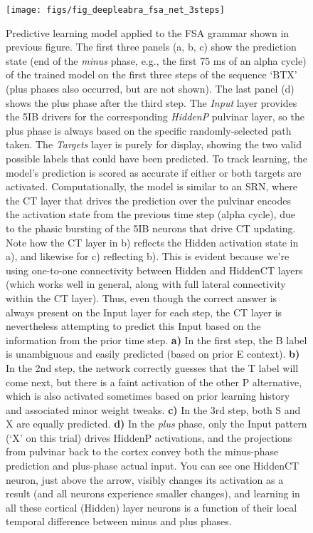 \documentclass[11pt,twoside]{article}
\newif\myifpdf
\begin{document}
\begin{figure}
  \centering\texttt{[image: figs/fig\_deepleabra\_fsa\_net\_3steps]}
  \caption{\footnotesize Predictive learning model applied to the FSA grammar shown in previous figure. The first three panels (a, b, c) show the prediction state (end of the \emph{minus} phase, e.g., the first 75 ms of an alpha cycle) of the trained model on the first three steps of the sequence `BTX' (plus phases also occurred, but are not shown).  The last panel (d) shows the plus phase after the third step.  The \emph{Input} layer provides the 5IB drivers for the corresponding \emph{HiddenP} pulvinar layer, so the plus phase is always based on the specific randomly-selected path taken.  The \emph{Targets} layer is purely for display, showing the two valid possible labels that could have been predicted.  To track learning, the model's prediction is scored as accurate if either or both targets are activated.  Computationally, the model is similar to an SRN, where the CT layer that drives the prediction over the pulvinar encodes the activation state from the previous time step (alpha cycle), due to the phasic bursting of the 5IB neurons that drive CT updating.  Note how the CT layer in b) reflects the Hidden activation state in a), and likewise for c) reflecting b).  This is evident because we're using one-to-one connectivity between Hidden and HiddenCT layers (which works well in general, along with full lateral connectivity within the CT layer).  Thus, even though the correct answer is always present on the Input layer for each step, the CT layer is nevertheless attempting to predict this Input based on the information from the prior time step.  {\bf a)} In the first step, the B label is unambiguous and easily predicted (based on prior E context). {\bf b)} In the 2nd step, the network correctly guesses that the T label will come next, but there is a faint activation of the other P alternative, which is also activated sometimes based on prior learning history and associated minor weight tweaks.  {\bf c)} In the 3rd step, both S and X are equally predicted.  {\bf d)} In the \emph{plus} phase, only the Input pattern (`X' on this trial) drives HiddenP activations, and the projections from pulvinar back to the cortex convey both the minus-phase prediction and plus-phase actual input.  You can see one HiddenCT neuron, just above the arrow, visibly changes its activation as a result (and all neurons experience smaller changes), and learning in all these cortical (Hidden) layer neurons is a function of their local temporal difference between minus and plus phases.}
  \label{fig.fsa_net}
\end{figure}
\end{document}
